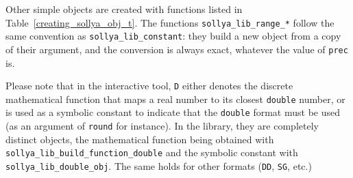 \documentclass[a4paper]{article}
\begin{document}
Other simple objects are created with functions listed in Table~\ref{creating_sollya_obj_t}. The functions \texttt{sollya\_lib\_range\_*} follow the same convention as \texttt{sollya\_lib\_constant}: they build a new object from a copy of their argument, and the conversion is always exact, whatever the value of \texttt{prec} is.

Please note that in the interactive tool, \texttt{D} either denotes the discrete mathematical function that maps a real number to its closest \texttt{double} number, or is used as a symbolic constant to indicate that the \texttt{double} format must be used (as an argument of \texttt{round} for instance). In the library, they are completely distinct objects, the mathematical function being obtained with \texttt{sollya\_lib\_build\_function\_double} and the symbolic constant with \texttt{sollya\_lib\_double\_obj}. The same holds for other formats (\texttt{DD}, \texttt{SG}, etc.)
\end{document}
